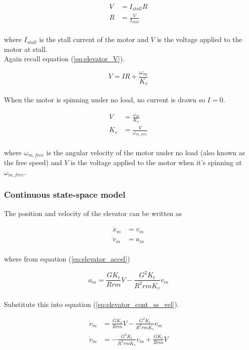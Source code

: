 \begin{align}
  V &= I_{stall} R \nonumber \\
  R &= \frac{V}{I_{stall}}
\end{align}
\\
where $I_{stall}$ is the stall current of the motor and $V$ is the voltage
applied to the motor at stall. \\

Again recall equation (\ref{eq:elevator_V}).

\begin{equation*}
  V = IR + \frac{\omega_m}{K_v}
\end{equation*}
\\
When the motor is spinning under no load, no current is drawn so $I = 0$.

\begin{align}
  V &= \frac{\omega_m}{K_v} \nonumber \\
  K_v &= \frac{V}{\omega_{m,free}}
\end{align}
\\
where $\omega_{m,free}$ is the angular velocity of the motor under no load (also
known as the free speed) and $V$ is the voltage applied to the motor when
it's spinning at $\omega_{m,free}$.

\subsubsection{Continuous state-space model}

The position and velocity of the elevator can be written as

\begin{align}
  \dot{x}_m &= v_m \label{eq:elevator_cont_ss_pos} \\
  \dot{v}_m &= a_m \label{eq:elevator_cont_ss_vel}
\end{align}
\\
where from equation (\ref{eq:elevator_accel})

\begin{equation*}
  a_m = \frac{GK_t}{Rrm} V - \frac{G^2 K_t}{R^2 rm K_v} v_m
\end{equation*}
\\
Substitute this into equation (\ref{eq:elevator_cont_ss_vel}).

\begin{align}
  \dot{v}_m &= \frac{GK_t}{Rrm} V - \frac{G^2 K_t}{R^2 rm K_v} v_m \nonumber \\
  \dot{v}_m &= -\frac{G^2 K_t}{R^2 rm K_v} v_m + \frac{GK_t}{Rrm} V
\end{align}

